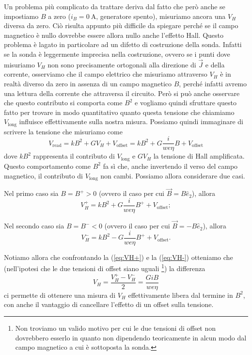 \documentclass[
    prl,
    reprint, 
    superscriptaddress, 
    altaffilletter, 
    amsmath, 
    amssymb, 
    a4paper,
    varvw]{revtex4-2}
\begin{document}
Un problema più complicato da trattare deriva dal fatto che però anche se impostiamo $B$ a zero ($i_B=\SI{0}{\ampere}$, generatore spento), misuriamo ancora una $V_H$ diversa da zero. Ciò risulta appunto più difficile da spiegare perché se il campo magnetico è nullo dovrebbe essere allora nullo anche l'effetto Hall. Questo problema è lagato in particolare ad un difetto di costruzione della sonda. Infatti se la sonda è leggermente imprecisa nella costruzione, ovvero se i punti dove misuriamo $V_H$ non sono precisamente ortogonali alla direzione di $\vec{J}$ e della corrente, osserviamo che il campo elettrico che misuriamo attraverso $V_H$ è in realtà diverso da zero in assenza di un campo magnetico $B$, perché infatti avremo una lettura della corrente che attraversa il circuito. Però si può anche osservare che questo contributo si comporta come $B^2$ e vogliamo quindi sfruttare questo fatto per trovare in modo quantitativo quanto questa tensione che chiamiamo $V_\text{long}$ influisce effettivamente sulla nostra misura. 
Possiamo quindi immaginare di scrivere la tensione che misuriamo come \begin{equation}
    V_\text{read} = kB^2 +  GV_H + V_\text{offset} = kB^2 + G\frac{i}{we\eta}B + V_\text{offset}\label{eq:full_fit}
\end{equation}
dove $kB^2$ rappresenta il contributo di $V_\text{long}$ e $GV_H$ la tensione di Hall amplificata.
Questo comportamento come $B^2$ fa sì che, anche invertendo il verso del campo magnetico, il contributo di $V_\text{long}$ non cambi.
Possiamo allora considerare due casi. 

Nel primo caso sia $B=B^+>0$ (ovvero il caso per cui $\vec{B} = B\hat{e}_2$), allora \begin{equation}
    V_H^+ = kB^2 + G\frac{i}{we\eta}B^+ + V_\text{offset};\label{eq:VH+}
\end{equation}

Nel secondo caso sia $B=B^-<0$ (ovvero il caso per cui $\vec{B} = -B\hat{e}_2$), allora \begin{equation}
    V_H^- = kB^2 - G\frac{i}{we\eta}B^+ + V_\text{offset}.\label{eq:VH-}
\end{equation}

Notiamo allora che confrontando la (\ref{eq:VH+}) e la (\ref{eq:VH-}) otteniamo che (nell'ipotesi che le due tensioni di offset siano uguali \footnote{Non troviamo un valido motivo per cui le due tensioni di offset non dovrebbero esserlo in quanto non dipendendo teoricamente in alcun modo dal campo magnetico a cui è sottoposta la sonda.}) la differenza \begin{equation}
    V_H = \frac{V_H^+ - V_H^-}{2} = \frac{GiB}{we\eta}\label{eq:model_fit}
\end{equation} ci permette di ottenere una misura di $V_H$ effettivamente libera dal termine in $B^2$, con anche il vantaggio di cancellare l'effetto di un offset sulla tensione.
\end{document}
